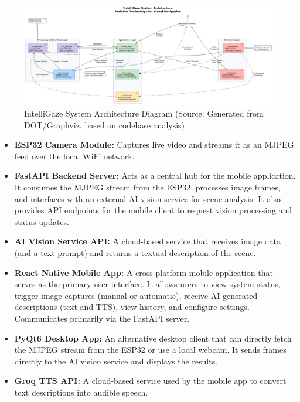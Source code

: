 \documentclass[12pt, a4paper]{report}
\begin{document}
\begin{figure}[H]
    \centering
    \includegraphics[height=0.6\textwidth, angle=90]{fig/system_architecture_diagram.png}
    \caption{IntelliGaze System Architecture Diagram (Source: Generated from DOT/Graphviz, based on codebase analysis)}
    \label{fig:system_architecture_diagram}
\end{figure}


\begin{itemize}
    \item \textbf{ESP32 Camera Module:} Captures live video and streams it as an MJPEG feed over the local WiFi network.
    \item \textbf{FastAPI Backend Server:} Acts as a central hub for the mobile application. It consumes the MJPEG stream from the ESP32, processes image frames, and interfaces with an external AI vision service for scene analysis. It also provides API endpoints for the mobile client to request vision processing and status updates.
    \item \textbf{AI Vision Service API:} A cloud-based service that receives image data (and a text prompt) and returns a textual description of the scene.
    \item \textbf{React Native Mobile App:} A cross-platform mobile application that serves as the primary user interface. It allows users to view system status, trigger image captures (manual or automatic), receive AI-generated descriptions (text and TTS), view history, and configure settings. Communicates primarily via the FastAPI server.
    \item \textbf{PyQt6 Desktop App:} An alternative desktop client that can directly fetch the MJPEG stream from the ESP32 or use a local webcam. It sends frames directly to the AI vision service and displays the results.
    \item \textbf{Groq TTS API:} A cloud-based service used by the mobile app to convert text descriptions into audible speech.
\end{itemize}
\end{document}
